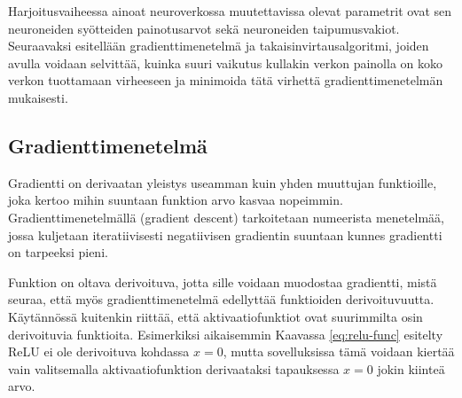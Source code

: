 \documentclass[finnish]{tktltiki2}
\theoremstyle{definition}
\theoremstyle{remark}
\begin{document}
  Harjoitusvaiheessa ainoat neuroverkossa muutettavissa olevat parametrit ovat sen neuroneiden syötteiden painotusarvot sekä neuroneiden taipumusvakiot. Seuraavaksi esitellään gradienttimenetelmä ja takaisinvirtausalgoritmi, joiden avulla voidaan selvittää, kuinka suuri vaikutus kullakin verkon painolla on koko verkon tuottamaan virheeseen ja minimoida tätä virhettä gradienttimenetelmän mukaisesti.



  \subsection{Gradienttimenetelmä}
  \label{chap:backprop}
  Gradientti on derivaatan yleistys useamman kuin yhden muuttujan funktioille, joka kertoo mihin suuntaan funktion arvo kasvaa nopeimmin. Gradienttimenetelmällä (gradient descent) tarkoitetaan numeerista menetelmää, jossa kuljetaan iteratiivisesti negatiivisen gradientin suuntaan kunnes gradientti on tarpeeksi pieni. 

  Funktion on oltava derivoituva, jotta sille voidaan muodostaa gradientti, mistä seuraa, että myös gradienttimenetelmä edellyttää funktioiden derivoituvuutta. Käytännössä kuitenkin riittää, että aktivaatiofunktiot ovat suurimmilta osin derivoituvia funktioita. 
  Esimerkiksi aikaisemmin Kaavassa \ref{eq:relu-func} esitelty ReLU ei ole derivoituva kohdassa $x = 0$, mutta sovelluksissa tämä voidaan kiertää vain valitsemalla aktivaatiofunktion derivaataksi tapauksessa $x=0$ jokin kiinteä arvo.
  
\end{document}
